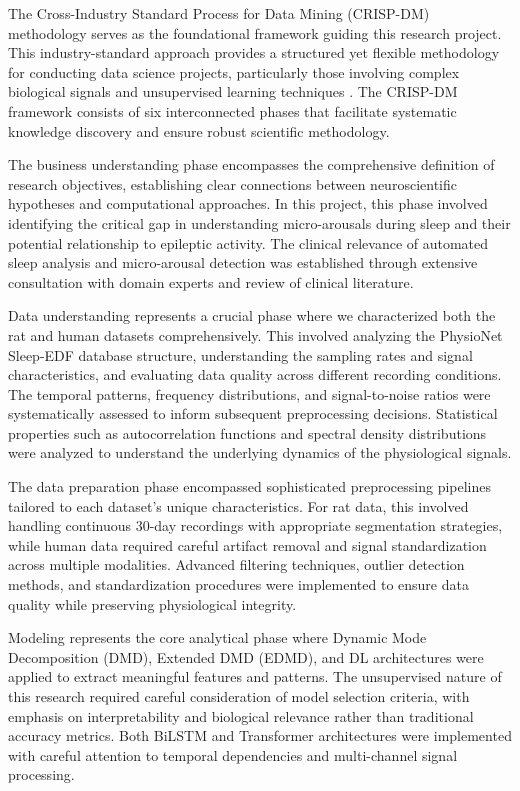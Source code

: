 \documentclass[a4paper,12pt,twoside]{article}
\begin{document}
The Cross-Industry Standard Process for Data Mining (CRISP-DM) methodology serves as the foundational framework guiding this research project. This industry-standard approach provides a structured yet flexible methodology for conducting data science projects, particularly those involving complex biological signals and unsupervised learning techniques \cite{wirth2000crisp}. The CRISP-DM framework consists of six interconnected phases that facilitate systematic knowledge discovery and ensure robust scientific methodology.

The business understanding phase encompasses the comprehensive definition of research objectives, establishing clear connections between neuroscientific hypotheses and computational approaches. In this project, this phase involved identifying the critical gap in understanding micro-arousals during sleep and their potential relationship to epileptic activity. The clinical relevance of automated sleep analysis and micro-arousal detection was established through extensive consultation with domain experts and review of clinical literature.

Data understanding represents a crucial phase where we characterized both the rat and human datasets comprehensively. This involved analyzing the PhysioNet Sleep-EDF database structure, understanding the sampling rates and signal characteristics, and evaluating data quality across different recording conditions. The temporal patterns, frequency distributions, and signal-to-noise ratios were systematically assessed to inform subsequent preprocessing decisions. Statistical properties such as autocorrelation functions and spectral density distributions were analyzed to understand the underlying dynamics of the physiological signals.

The data preparation phase encompassed sophisticated preprocessing pipelines tailored to each dataset's unique characteristics. For rat data, this involved handling continuous 30-day recordings with appropriate segmentation strategies, while human data required careful artifact removal and signal standardization across multiple modalities. Advanced filtering techniques, outlier detection methods, and standardization procedures were implemented to ensure data quality while preserving physiological integrity.

Modeling represents the core analytical phase where Dynamic Mode Decomposition (DMD), Extended DMD (EDMD), and DL architectures were applied to extract meaningful features and patterns. The unsupervised nature of this research required careful consideration of model selection criteria, with emphasis on interpretability and biological relevance rather than traditional accuracy metrics. Both BiLSTM and Transformer architectures were implemented with careful attention to temporal dependencies and multi-channel signal processing.
\end{document}

